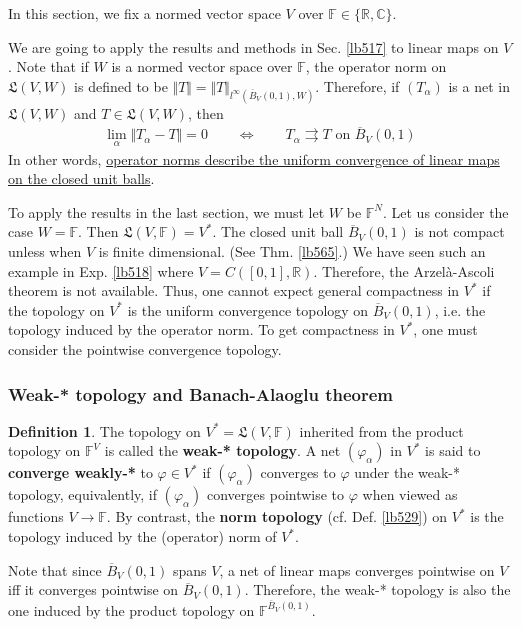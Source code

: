 \documentclass[12pt,b5paper,notitlepage]{article}
\theoremstyle{definition}
\newtheorem{df}{Definition}[section]
\theoremstyle{plain}
\newcommand{\fk}{\mathfrak}
\newcommand{\ovl}{\overline}
\newcommand{\Cbb}{\mathbb C}
\newcommand{\Rbb}{\mathbb R}
\newcommand{\Fbb}{\mathbb F}
\numberwithin{equation}{section}
\begin{document}
In this section, we fix a normed vector space $V$ over $\Fbb\in\{\Rbb,\Cbb\}$.

We are going to apply the results and methods in Sec. \ref{lb517} to linear maps on $V$. Note that if $W$ is a normed vector space over $\Fbb$, the operator norm on $\fk L(V,W)$ is defined to be $\Vert T\Vert=\Vert T\Vert_{l^\infty(\ovl B_V(0,1),W)}$. Therefore, if $(T_\alpha)$ is a net in $\fk L(V,W)$ and $T\in\fk L(V,W)$, then
\begin{align}
\lim_\alpha \Vert T_\alpha-T\Vert=0\qquad\Longleftrightarrow\qquad T_\alpha\rightrightarrows T\text{ on }\ovl B_V(0,1) 
\end{align}
In other words, \uline{operator norms describe the uniform convergence of linear maps on the closed unit balls}.

To apply the results in the last section, we must let $W$ be $\Fbb^N$. Let us consider the case $W=\Fbb$. Then $\fk L(V,\Fbb)=V^*$. The closed unit ball $\ovl B_V(0,1)$ is not compact unless when $V$ is finite dimensional. (See Thm. \ref{lb565}.) We have seen such an example in Exp. \ref{lb518} where $V=C([0,1],\Rbb)$. Therefore, the Arzel\`a-Ascoli theorem is not available. Thus, one cannot expect general compactness in $V^*$ if the topology on $V^*$ is the uniform  convergence topology on $\ovl B_V(0,1)$, i.e. the topology induced by the operator norm. To get compactness in $V^*$, one must consider the pointwise convergence topology.



\subsubsection{Weak-* topology and Banach-Alaoglu theorem}


\begin{df}
The topology on $V^*=\fk L(V,\Fbb)$ inherited from the product topology on $\Fbb^V$ is called the \textbf{weak-* topology}.  A net $(\varphi_\alpha)$ in $V^*$ is said to \textbf{converge weakly-*} to $\varphi\in V^*$ if $(\varphi_\alpha)$ converges to $\varphi$ under the weak-* topology, equivalently, if $(\varphi_\alpha)$ converges pointwise to $\varphi$ when viewed as functions $V\rightarrow\Fbb$. By contrast, the \textbf{norm topology}  (cf. Def. \ref{lb529}) on $V^*$ is the topology induced by the (operator) norm of $V^*$.
\end{df}

Note that since $\ovl B_V(0,1)$ spans $V$, a net of linear maps converges pointwise on $V$ iff it converges pointwise on $\ovl B_V(0,1)$. Therefore, the weak-* topology is also the one induced by the product topology on $\Fbb^{\ovl B_V(0,1)}$.
\end{document}
